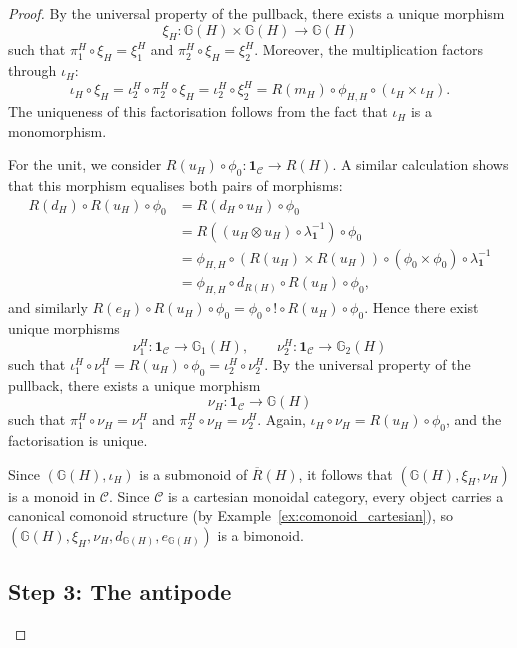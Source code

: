 \documentclass{amsart}
\begin{document}
\begin{proof}
By the universal property of the pullback, there exists a unique morphism
\[
\xi_H \colon \mathbb{G}(H) \times \mathbb{G}(H) \longrightarrow \mathbb{G}(H)
\]
such that $\pi^H_1 \circ \xi_H = \xi^H_1$ and $\pi^H_2 \circ \xi_H = \xi^H_2$. Moreover, the multiplication factors through $\iota_H$:
\[
\iota_H \circ \xi_H
= \iota^H_2 \circ \pi^H_2 \circ \xi_H
= \iota^H_2 \circ \xi^H_2
= R(m_H) \circ \phi_{H,H} \circ (\iota_H \times \iota_H).
\]
The uniqueness of this factorisation follows from the fact that $\iota_H$ is a monomorphism.

For the unit, we consider $R(u_H) \circ \phi_0 \colon \mathbf{1}_{\mathcal{C}} \longrightarrow R(H)$. A similar calculation shows that this morphism equalises both pairs of morphisms:
\begin{align*}
R(d_H) \circ R(u_H) \circ \phi_0
&= R(d_H \circ u_H) \circ \phi_0 \\
&= R((u_H \otimes u_H) \circ \lambda_{\mathbf{1}}^{-1}) \circ \phi_0 \\
&= \phi_{H,H} \circ (R(u_H) \times R(u_H)) \circ (\phi_0 \times \phi_0) \circ \lambda_{\mathbf{1}}^{-1} \\
&= \phi_{H,H} \circ d_{R(H)} \circ R(u_H) \circ \phi_0,
\end{align*}
and similarly $R(e_H) \circ R(u_H) \circ \phi_0 = \phi_0 \circ ! \circ R(u_H) \circ \phi_0$. Hence there exist unique morphisms
\[
\nu^H_1 \colon \mathbf{1}_{\mathcal{C}} \longrightarrow \mathbb{G}_1(H), \qquad
\nu^H_2 \colon \mathbf{1}_{\mathcal{C}} \longrightarrow \mathbb{G}_2(H)
\]
such that $\iota^H_1 \circ \nu^H_1 = R(u_H) \circ \phi_0 = \iota^H_2 \circ \nu^H_2$. By the universal property of the pullback, there exists a unique morphism
\[
\nu_H \colon \mathbf{1}_{\mathcal{C}} \longrightarrow \mathbb{G}(H)
\]
such that $\pi^H_1 \circ \nu_H = \nu^H_1$ and $\pi^H_2 \circ \nu_H = \nu^H_2$. Again, $\iota_H \circ \nu_H = R(u_H) \circ \phi_0$, and the factorisation is unique.

Since $(\mathbb{G}(H), \iota_H)$ is a submonoid of $\overline{R}(H)$, it follows that $(\mathbb{G}(H), \xi_H, \nu_H)$ is a monoid in $\mathcal{C}$. Since $\mathcal{C}$ is a cartesian monoidal category, every object carries a canonical comonoid structure (by Example~\ref{ex:comonoid_cartesian}), so $(\mathbb{G}(H), \xi_H, \nu_H, d_{\mathbb{G}(H)}, e_{\mathbb{G}(H)})$ is a bimonoid.

\subsection*{Step 3: The antipode}


\end{proof}
\end{document}
